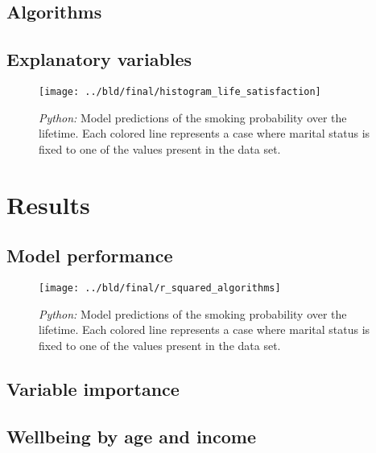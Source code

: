 \documentclass[11pt, a4paper, leqno]{article}
\begin{document}
\subsection{Algorithms}

\subsection{Explanatory variables}





\begin{figure}[htbp]
    \centering
    \texttt{[image: ../bld/final/histogram\_life\_satisfaction]}
    \caption{\emph{Python:} Model predictions of the smoking probability over the lifetime. Each colored line represents a case where marital status is fixed to one of the values present in the data set.}
    \label{fig:histogram_life_satisfaction}
\end{figure}


\section{Results} %
\label{sec:results}

\subsection{Model performance}

\begin{figure}[htbp]
    \centering
    \texttt{[image: ../bld/final/r\_squared\_algorithms]}
    \caption{\emph{Python:} Model predictions of the smoking probability over the lifetime. Each colored line represents a case where marital status is fixed to one of the values present in the data set.}
    \label{fig:r_squared_algorithms}
\end{figure}


\subsection{Variable importance}






\subsection{Wellbeing by age and income}
\end{document}
